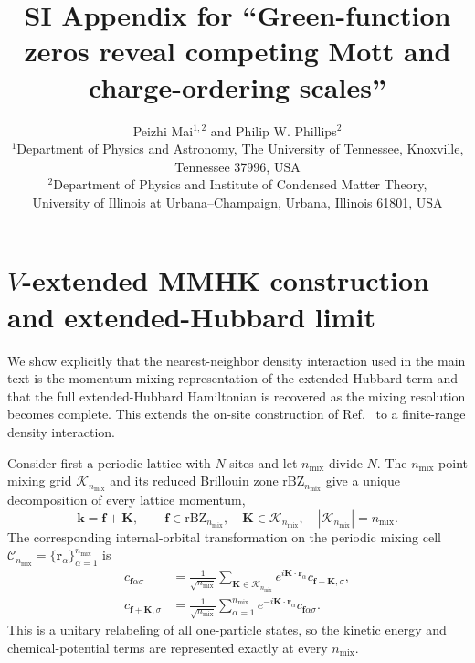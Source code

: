 \documentclass[10pt]{article}
\title{SI Appendix for ``Green-function zeros reveal competing Mott and charge-ordering scales''}
\author{Peizhi Mai$^{1,2}$ and Philip W. Phillips$^{2}$\\[0.35em]
\small $^{1}$Department of Physics and Astronomy, The University of Tennessee, Knoxville, Tennessee 37996, USA\\
\small $^{2}$Department of Physics and Institute of Condensed Matter Theory,\\[-0.1em]
\small University of Illinois at Urbana--Champaign, Urbana, Illinois 61801, USA}
\date{}
\newcommand{\nmix}{n_{\mathrm{mix}}}
\begin{document}
\maketitle
\tableofcontents

\section{$V$-extended MMHK construction and extended-Hubbard limit}
\label{sec:s-vextended-limit}
We show explicitly that the nearest-neighbor density interaction used in the main text is the momentum-mixing representation of the extended-Hubbard term and that the full extended-Hubbard Hamiltonian is recovered as the mixing resolution becomes complete. This extends the on-site construction of Ref.~\cite{mai2026twisting} to a finite-range density interaction.

Consider first a periodic lattice with $N$ sites and let $\nmix$ divide $N$. The $\nmix$-point mixing grid $\mathcal K_{\nmix}$ and its reduced Brillouin zone $\mathrm{rBZ}_{\nmix}$ give a unique decomposition of every lattice momentum,
\begin{equation}
 \mathbf k=\mathbf f+\mathbf K,
 \qquad
 \mathbf f\in\mathrm{rBZ}_{\nmix},
 \quad \mathbf K\in\mathcal K_{\nmix},
 \quad |\mathcal K_{\nmix}|=\nmix.
 \label{eq:s-momentum-partition}
\end{equation}
The corresponding internal-orbital transformation on the periodic mixing cell $\mathcal C_{\nmix}=\{\mathbf r_\alpha\}_{\alpha=1}^{\nmix}$ is
\begin{equation}
 \begin{aligned}
 c_{\mathbf f\alpha\sigma}
 &=\frac{1}{\sqrt{\nmix}}\sum_{\mathbf K\in\mathcal K_{\nmix}}
 e^{i\mathbf K\cdot\mathbf r_\alpha}
 c_{\mathbf f+\mathbf K,\sigma},\\
 c_{\mathbf f+\mathbf K,\sigma}
 &=\frac{1}{\sqrt{\nmix}}\sum_{\alpha=1}^{\nmix}
 e^{-i\mathbf K\cdot\mathbf r_\alpha}
 c_{\mathbf f\alpha\sigma}.
 \end{aligned}
 \label{eq:s-internal-transform}
\end{equation}
This is a unitary relabeling of all one-particle states, so the kinetic energy and chemical-potential terms are represented exactly at every $\nmix$.
\end{document}

